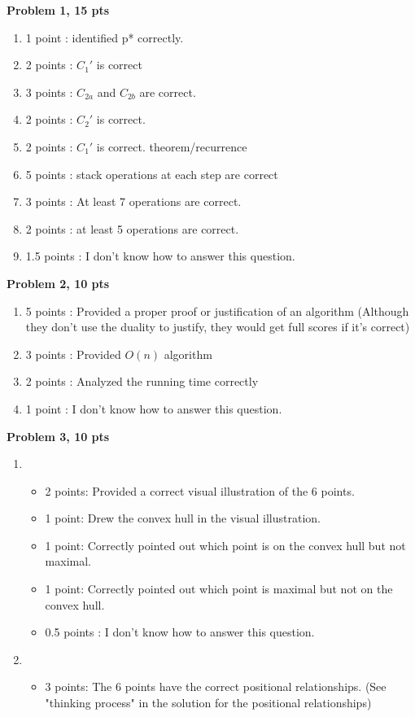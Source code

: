 \documentclass[11pt]{article}
\begin{document}
\begin{qunlist}
\bigskip
{\bf Problem 1, 15 pts}
\begin{enumerate}
    \item 1 point : identified p* correctly.
    \item 2 points : $C_1'$ is correct
    \item 3 points : $C_{2a}$ and $C_{2b}$ are correct.
    \item 2 points : $C_2'$ is correct.
    \item 2 points : $C_1'$ is correct. theorem/recurrence
    \item 5 points : stack operations at each step are correct
    \item 3 points : At least 7 operations are correct.
    \item 2 points : at least 5 operations are correct.
    \item 1.5 points : I don’t know how to answer this question.
\end{enumerate}
{\bf Problem 2, 10 pts}
\begin{enumerate}
    \item 5 points : Provided a proper proof or justification of an algorithm (Although they don't use the duality to justify, they would get full scores if it's correct)
    \item 3 points : Provided $O(n)$ algorithm
    \item 2 points : Analyzed the running time correctly
    \item 1 point : I don't know how to answer this question.
\end{enumerate}
{\bf Problem 3, 10 pts}
\begin{enumerate}
    \item \begin{itemize}
        \item 2 points: Provided a correct visual illustration of the 6 points.
        \item 1 point: Drew the convex hull in the visual illustration.
        \item 1 point: Correctly pointed out which point is on the convex hull but not maximal.
        \item 1 point: Correctly pointed out which point is maximal but not on the convex hull.
        \item 0.5 points : I don’t know how to answer this question.
    \end{itemize}
    \item \begin{itemize}
        \item 3 points: The 6 points have the correct positional relationships. (See "thinking process" in the solution for the positional relationships)

\end{itemize}
\end{enumerate}
\end{qunlist}
\end{document}
